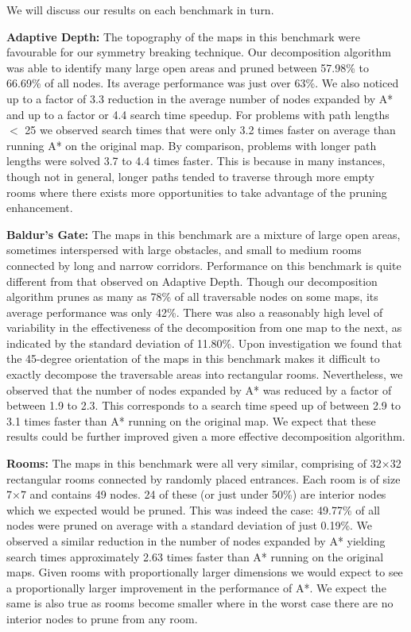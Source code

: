 We will discuss our results on each benchmark in turn.

\textbf{Adaptive Depth:} 
The topography of the maps in this benchmark were favourable for
our symmetry breaking technique.  Our decomposition algorithm was
able to identify many large open areas and pruned between 57.98\%
to 66.69\% of all nodes.  Its average performance was just over
63\%.  We also noticed up to a factor of 3.3 reduction in the average number
of nodes expanded by A* and up to a factor or 4.4 search time
speedup.  For problems with path lengths $<$ 25
we observed search times that were only 3.2 times faster on average
than running A* on the original map.  By comparison, problems with
longer path lengths were solved 3.7 to 4.4 times faster.  
This is because in many instances, though not in general, longer paths 
tended to traverse through more empty rooms where there exists more 
opportunities to take advantage of the pruning enhancement.
%
\par
\textbf{Baldur's Gate: }
The maps in this benchmark are a mixture of large open areas,
sometimes interspersed with large obstacles, and small to medium
rooms connected by long and narrow corridors.  Performance on this
benchmark is quite different from that observed on Adaptive Depth.
Though our decomposition algorithm prunes as many as 78\% of all
traversable nodes on some maps, its average performance was only
42\%.  There was also a reasonably high level of variability in the
effectiveness of the decomposition from one map to the next, as
indicated by the standard deviation of 11.80\%.  Upon investigation
we found that the 45-degree orientation of the maps in this benchmark
makes it difficult to exactly decompose the traversable areas into
 rectangular rooms.
Nevertheless, we observed that the number of nodes expanded by A*
was reduced by a factor of between 1.9 to 2.3.  This corresponds
to a search time speed up of between 2.9 to 3.1 times faster than
A* running on the original map.  We expect that these results could be
further improved given a more effective decomposition algorithm.
\par 
\textbf{Rooms:} 
The maps in this benchmark were all very similar, comprising of
32$\times$32 rectangular rooms connected by randomly placed entrances.
Each room is of size 7$\times$7 and contains 49 nodes.  24 of these
(or just under 50\%) are interior nodes which we expected would be
pruned.  This was indeed the case: 49.77\% of all nodes were pruned
on average with a standard deviation of just 0.19\%.  We observed
a similar reduction in the number of nodes expanded by A* yielding
search times approximately 2.63 times faster than A* running on the
original maps.  Given rooms with proportionally larger dimensions
we would expect to see a proportionally larger improvement in the
performance of A*.  We expect the same is also true as rooms become
smaller where in the worst case there are no interior nodes to prune
from any room.

